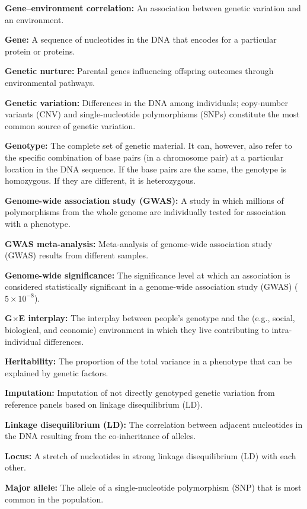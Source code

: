 \documentclass[12pt,a4paper]{article}
\begin{document}
\begin{bibunit}
\textbf{Gene--environment correlation:} An association between genetic variation and an environment.

\textbf{Gene:} A sequence of nucleotides in the DNA that encodes for a particular protein or proteins.

\textbf{Genetic nurture:} Parental genes influencing offspring outcomes through environmental pathways.

\textbf{Genetic variation:} Differences in the DNA among individuals; copy-number variants (CNV) and single-nucleotide polymorphisms (SNPs) constitute the most common source of genetic variation.

\textbf{Genotype:} The complete set of genetic material. It can, however, also refer to the specific combination of base pairs (in a chromosome pair) at a particular location in the DNA sequence. If the base pairs are the same, the genotype is homozygous. If they are different, it is heterozygous.

\textbf{Genome-wide association study (GWAS):} A study in which millions of polymorphisms from the whole genome are individually tested for association with a phenotype.

\textbf{GWAS meta-analysis:} Meta-analysis of genome-wide association study (GWAS) results from different samples.

\textbf{Genome-wide significance:} The significance level at which an association is considered statistically significant in a genome-wide association study (GWAS) ($5\times10^{-8}$).

\textbf{G$\times$E interplay:} The interplay between people’s genotype and the (e.g., social, biological, and economic) environment in which they live contributing to intra-individual differences.

\textbf{Heritability:} The proportion of the total variance in a phenotype that can be explained by genetic factors.

\textbf{Imputation:} Imputation of not directly genotyped genetic variation from reference panels based on linkage disequilibrium (LD).

\textbf{Linkage disequilibrium (LD):} The correlation between adjacent nucleotides in the DNA resulting from the co-inheritance of alleles.

\textbf{Locus:} A stretch of nucleotides in strong linkage disequilibrium (LD) with each other.

\textbf{Major allele:} The allele of a single-nucleotide polymorphism (SNP) that is most common in the population.


\end{bibunit}
\end{document}
